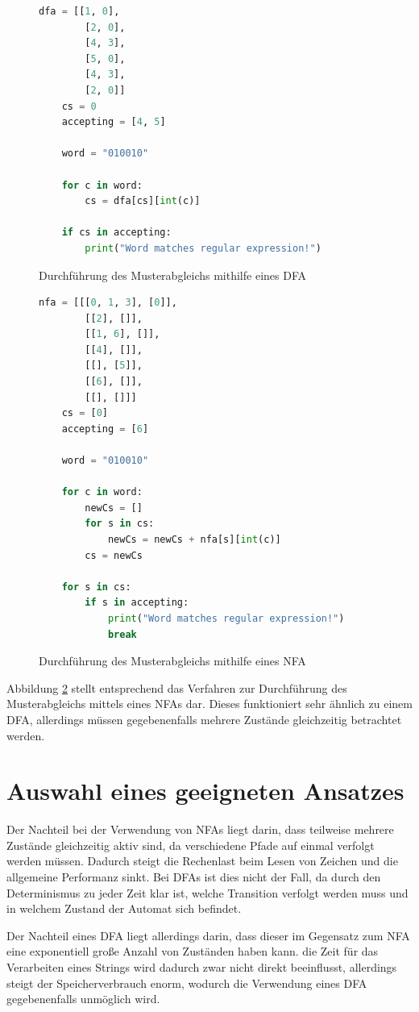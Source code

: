 \begin{figure}[]
	\begin{lstlisting}[language=Python]
	dfa = [[1, 0],
		[2, 0],
		[4, 3],
		[5, 0],
		[4, 3],
		[2, 0]]
	cs = 0
	accepting = [4, 5]
	
	word = "010010"
	
	for c in word:
		cs = dfa[cs][int(c)]
	
	if cs in accepting:
		print("Word matches regular expression!")
	\end{lstlisting}
	\caption{Durchführung des Musterabgleichs mithilfe eines DFA}
	\label{dfa_matching}
\end{figure}

\begin{figure}[]
	\begin{lstlisting}[language=Python]
	nfa = [[[0, 1, 3], [0]],
		[[2], []],
		[[1, 6], []],
		[[4], []],
		[[], [5]],
		[[6], []],
		[[], []]]
	cs = [0]
	accepting = [6]
	
	word = "010010"
	
	for c in word:
		newCs = []
		for s in cs:
			newCs = newCs + nfa[s][int(c)]
		cs = newCs
	
	for s in cs:
		if s in accepting:
			print("Word matches regular expression!")
			break
	\end{lstlisting}
	\caption{Durchführung des Musterabgleichs mithilfe eines NFA}
	\label{nfa_matching}
\end{figure}

Abbildung \ref{nfa_matching} stellt entsprechend das Verfahren zur Durchführung des Musterabgleichs mittels eines NFAs dar.
Dieses funktioniert sehr ähnlich zu einem DFA, allerdings müssen gegebenenfalls mehrere Zustände gleichzeitig betrachtet werden.

\section{Auswahl eines geeigneten Ansatzes}

Der Nachteil bei der Verwendung von NFAs liegt darin, dass teilweise mehrere Zustände gleichzeitig aktiv sind, da verschiedene Pfade auf einmal verfolgt werden müssen.
Dadurch steigt die Rechenlast beim Lesen von Zeichen und die allgemeine Performanz sinkt.
Bei DFAs ist dies nicht der Fall, da durch den Determinismus zu jeder Zeit klar ist, welche Transition verfolgt werden muss und in welchem Zustand der Automat sich befindet.

Der Nachteil eines DFA liegt allerdings darin, dass dieser im Gegensatz zum NFA eine exponentiell große Anzahl von Zuständen haben kann.
die Zeit für das Verarbeiten eines Strings wird dadurch zwar nicht direkt beeinflusst, allerdings steigt der Speicherverbrauch enorm, wodurch die Verwendung eines DFA gegebenenfalls unmöglich wird.

